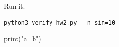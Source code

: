 \documentclass{akizumi-hw}
\begin{document}
\begin{problem}
Run it.
\begin{solution}
\begin{verbatim}
python3 verify_hw2.py --n_sim=10
\end{verbatim}
\begin{codeblock}[lang=python]
print("a_b")
\end{codeblock}
\end{solution}
\end{problem}
\end{document}

